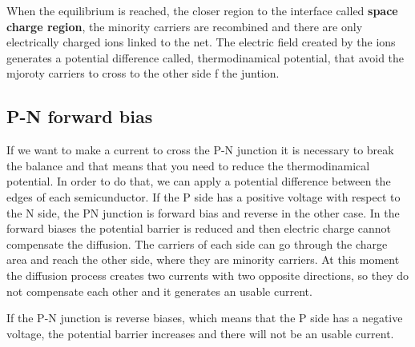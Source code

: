When the equilibrium is reached, the closer region to the interface called \textbf{space charge region}, the minority carriers are recombined and there are only electrically charged ions linked to the net. The electric field created by the ions generates a potential difference called, thermodinamical potential, that avoid the mjoroty carriers to cross to the other side f the juntion.

\subsection{P-N forward bias}


If we want to make a current to cross the P-N junction it is necessary to break the balance and that means that you need to reduce the thermodinamical potential. In order to do that, we can apply a potential difference between the edges of each semicunductor. If the P side has a positive voltage with respect to the N side, the PN junction is forward bias and reverse in the other case. In the forward biases the potential barrier is reduced and then electric charge cannot compensate the diffusion. The carriers of each side can go through the charge area and reach the other side, where they are minority carriers. At this moment the diffusion process creates two currents with two opposite directions, so they do not compensate each other and it generates an usable current. 


If the P-N junction is reverse biases, which means that the P side has a negative voltage, the potential barrier increases and there will not be an usable current.

